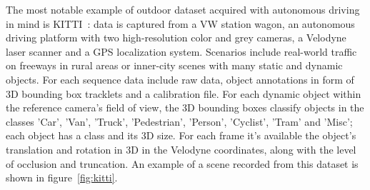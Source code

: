 The most notable example of outdoor dataset acquired with autonomous driving in mind is KITTI~\cite{kitti}: data is captured from a VW station wagon, an autonomous driving platform with two high-resolution color and grey cameras, a Velodyne laser scanner and a GPS localization system. Scenarios include real-world traffic on freeways in rural areas or inner-city scenes with many static and dynamic objects. For each sequence data include raw data, object annotations in form of 3D bounding box tracklets and a calibration file. For each dynamic object within the reference camera's field of view, the 3D bounding boxes classify objects in the classes 'Car', 'Van', 'Truck', 'Pedestrian', 'Person', 'Cyclist', 'Tram' and 'Misc'; each object has a class and its 3D size. For each frame it's available the object's translation and rotation in 3D in the Velodyne coordinates, along with the level of occlusion and truncation.
An example of a scene recorded from this dataset is shown in figure~\ref{fig:kitti}.







